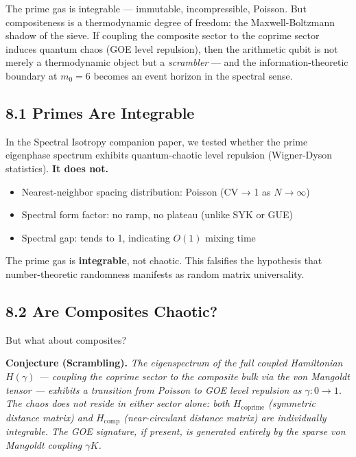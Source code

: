 \documentclass[
  11pt,
]{article}
\providecommand{\tightlist}{%
  \setlength{\itemsep}{0pt}\setlength{\parskip}{0pt}}
\numberwithin{equation}{section}
\begin{document}
The prime gas is integrable --- immutable, incompressible, Poisson. But
compositeness is a thermodynamic degree of freedom: the
Maxwell-Boltzmann shadow of the sieve. If coupling the composite sector
to the coprime sector induces quantum chaos (GOE level repulsion), then
the arithmetic qubit is not merely a thermodynamic object but a
\emph{scrambler} --- and the information-theoretic boundary at
\(m_0 = 6\) becomes an event horizon in the spectral sense.

\subsection{8.1 Primes Are Integrable}\label{primes-are-integrable}

In the Spectral Isotropy companion paper, we tested whether the prime
eigenphase spectrum exhibits quantum-chaotic level repulsion
(Wigner-Dyson statistics). \textbf{It does not.}

\begin{itemize}
\tightlist
\item
  Nearest-neighbor spacing distribution: Poisson (CV → 1 as
  \(N \to \infty\))
\item
  Spectral form factor: no ramp, no plateau (unlike SYK or GUE)
\item
  Spectral gap: tends to 1, indicating \(O(1)\) mixing time
\end{itemize}

The prime gas is \textbf{integrable}, not chaotic. This falsifies the
hypothesis that number-theoretic randomness manifests as random matrix
universality.

\subsection{8.2 Are Composites
Chaotic?}\label{are-composites-chaotic}

But what about composites?

\textbf{Conjecture (Scrambling).} \emph{The eigenspectrum of the full
coupled Hamiltonian \(H(\gamma)\) --- coupling the coprime sector to the
composite bulk via the von Mangoldt tensor --- exhibits a transition
from Poisson to GOE level repulsion as \(\gamma: 0 \to 1\). The chaos
does not reside in either sector alone: both \(H_{\text{coprime}}\)
(symmetric distance matrix) and \(H_{\text{comp}}\) (near-circulant
distance matrix) are individually integrable. The GOE signature, if
present, is generated entirely by the sparse von Mangoldt coupling
\(\gamma K\).}
\end{document}
